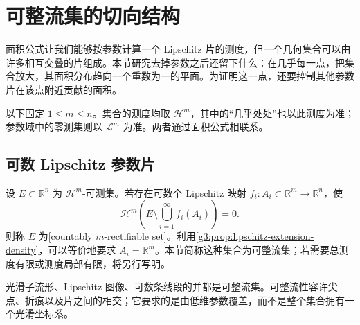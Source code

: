 
% 
% 
% 

\section{可整流集的切向结构}
\label{g3:sec:2005}

面积公式让我们能够按参数计算一个 Lipschitz 片的测度，但一个几何集合可以由许多相互交叠的片组成。本节研究去掉参数之后还留下什么：在几乎每一点，把集合放大，其面积分布趋向一个重数为一的平面。为证明这一点，还要控制其他参数片在该点附近贡献的面积。

\ProseParagraphBreak
以下固定 \(1\le m\le n\)。集合的测度均取 \(\mathcal H^m\)，其中的“几乎处处”也以此测度为准；参数域中的零测集则以 \(\mathcal L^m\) 为准。两者通过面积公式相联系。

\subsection{可数 Lipschitz 参数片}
\label{g3:subsec:2005:01}
\begin{definition}\label{g3:def:countably-rectifiable-set}
	设 \(E\subset\mathbb R^n\) 为 \(\mathcal H^m\)-可测集。若存在可数个 Lipschitz 映射 \(f_i:A_i\subset\mathbb R^m\to\mathbb R^n\)，使
	\[
		\mathcal H^m\left(E\setminus\bigcup_{i=1}^{\infty}f_i(A_i)\right)=0.
	\]
	则称 \(E\) 为[countably \(m\)-rectifiable set]。利用\cref{g3:prop:lipschitz-extension-density}，可以等价地要求 \(A_i=\mathbb R^m\)。本节简称这种集合为可整流集；若需要总测度有限或测度局部有限，将另行写明。
\end{definition}

光滑子流形、Lipschitz 图像、可数条线段的并都是可整流集。可整流性容许尖点、折痕以及片之间的相交；它要求的是由低维参数覆盖，而不是整个集合拥有一个光滑坐标系。

